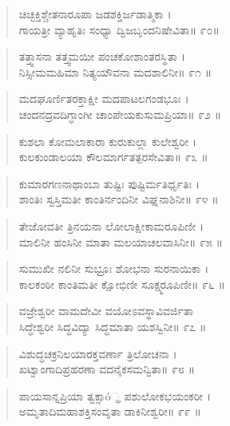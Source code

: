 \begin{verse}
ಚಿಚ್ಛಕ್ತಿಶ್ಚೇತನಾರೂಪಾ ಜಡಶಕ್ತಿರ್ಜಡಾತ್ಮಿಕಾ ।\\ಗಾಯತ್ರೀ ವ್ಯಾಹೃತಿಃ ಸಂಧ್ಯಾ ದ್ವಿಜಬೃಂದನಿಷೇವಿತಾ\num{॥ ೯೦॥}
\end{verse}

\begin{verse}
ತತ್ತ್ವಾಸನಾ ತತ್ತ್ವಮಯೀ ಪಂಚಕೋಶಾಂತರಸ್ಥಿತಾ ।\\ನಿಸ್ಸೀಮಮಹಿಮಾ ನಿತ್ಯಯೌವನಾ ಮದಶಾಲಿನೀ\num{॥ ೯೧ ॥}
\end{verse}

\begin{verse}
ಮದಘೂರ್ಣಿತರಕ್ತಾಕ್ಷೀ ಮದಪಾಟಲಗಂಡಭೂಃ ।\\ಚಂದನದ್ರವದಿಗ್ಧಾಂಗೀ ಚಾಂಪೇಯಕುಸುಮಪ್ರಿಯಾ\num{॥ ೯೨ ॥}
\end{verse}

\begin{verse}
ಕುಶಲಾ ಕೋಮಲಾಕಾರಾ ಕುರುಕುಲ್ಲಾ ಕುಲೇಶ್ವರೀ ।\\ಕುಲಕುಂಡಾಲಯಾ  ಕೌಲಮಾರ್ಗತತ್ಪರಸೇವಿತಾ\num{॥ ೯೩ ॥}
\end{verse}

\begin{verse}
ಕುಮಾರಗಣನಾಥಾಂಬಾ ತುಷ್ಟಿಃ ಪುಷ್ಟಿರ್ಮತಿರ್ಧೃತಿಃ ।\\ಶಾಂತಿಃ ಸ್ವಸ್ತಿಮತೀ ಕಾಂತಿರ್ನಂದಿನೀ  ವಿಘ್ನನಾಶಿನೀ\num{॥ ೯೪ ॥}
\end{verse}

\begin{verse}
ತೇಜೋವತೀ ತ್ರಿನಯನಾ ಲೋಲಾಕ್ಷೀಕಾಮರೂಪಿಣೀ ।\\ಮಾಲಿನೀ ಹಂಸಿನೀ ಮಾತಾ ಮಲಯಾಚಲವಾಸಿನೀ\num{॥ ೯೫ ॥}
\end{verse}

\begin{verse}
ಸುಮುಖೀ ನಲಿನೀ  ಸುಭ್ರೂಃ ಶೋಭನಾ ಸುರನಾಯಿಕಾ ।\\ಕಾಲಕಂಠೀ ಕಾಂತಿಮತೀ ಕ್ಷೋಭಿಣೀ ಸೂಕ್ಷ್ಮರೂಪಿಣೀ\num{॥ ೯೬ ॥}
\end{verse}

\begin{verse}
ವಜ್ರೇಶ್ವರೀ ವಾಮದೇವೀ ವಯೋಽವಸ್ಥಾವಿವರ್ಜಿತಾ \\ಸಿದ್ಧೇಶ್ವರೀ ಸಿದ್ಧವಿದ್ಯಾ ಸಿದ್ಧಮಾತಾ ಯಶಸ್ವಿನೀ\num{॥ ೯೭ ॥}
\end{verse}

\begin{verse}
ವಿಶುದ್ಧಚಕ್ರನಿಲಯಾರಕ್ತವರ್ಣಾ ತ್ರಿಲೋಚನಾ ।\\ಖಟ್ವಾಂಗಾದಿಪ್ರಹರಣಾ ವದನೈಕಸಮನ್ವಿತಾ\num{॥ ೯೮ ॥}
\end{verse}

\begin{verse}
ಪಾಯಸಾನ್ನಪ್ರಿಯಾ  ತ್ವಕ್ಸಾó್ಥ ಪಶುಲೋಕಭಯಂಕರೀ ।\\ಅಮೃತಾದಿಮಹಾಶಕ್ತಿಸಂವೃತಾ ಡಾಕಿನೀಶ್ವರೀ\num{॥ ೯೯ ॥}
\end{verse}

